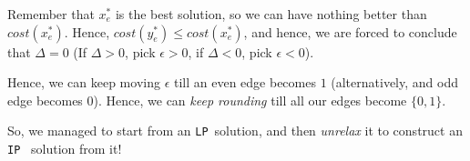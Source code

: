 \documentclass[11pt]{book}
\newcommand{\ip}{\texttt{IP} }
\newcommand{\lp}{\texttt{LP}}
\begin{document}
\begin{itemize}
        Remember that $x_e^*$ is the best solution, so we can have nothing
        better than $cost(x_e^*)$. Hence, $cost(y_e^*) \leq cost(x_e^*)$,
        and hence, we are forced to conclude that $\Delta = 0$ 
        (If $\Delta > 0$, pick $\epsilon > 0$, if $\Delta < 0$, pick $\epsilon
        < 0$). 

        Hence, we can keep moving $\epsilon$ till an even edge becomes $1$
        (alternatively, and odd edge becomes $0$). Hence, we can \textit{keep rounding}
        till all our edges become $\{0, 1\}$.
\end{itemize}

So, we managed to start from an \lp~solution, and then \textit{unrelax} it to
construct an \ip~solution from it!
\end{document}
